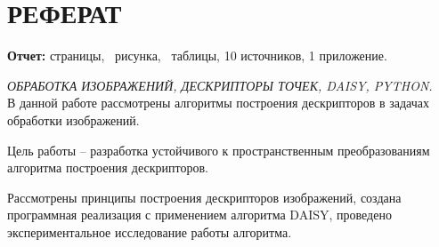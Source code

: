 
\def\l@subsection{\@dottedtocline{2}{3.8em}{3.2em}}
\setcounter{tocdepth}{2}



\newcommand{\incpic}[3]{
	\begin{figure}[H] 
		\begin{center} 
			\texttt{[image: \#1]} 
			\caption{#2}
			\label{#3} 
		\end{center}
	\end{figure} 
}




\setcounter{page}{3}
\setcounter{secnumdepth}{3}

\section*{РЕФЕРАТ}
{
	{\bf Отчет:}
	\pageref{LastPage} страницы,
	\totalfigures\ рисунка,
	\totaltables\ таблицы,
	10 источников,
	1 приложение.
	
	
	\textit{ОБРАБОТКА ИЗОБРАЖЕНИЙ, ДЕСКРИПТОРЫ ТОЧЕК, DAISY, PYTHON.}\\
	
	В данной работе рассмотрены алгоритмы построения дескрипторов в задачах обработки изображений.
	
	Цель работы -- разработка устойчивого к пространственным преобразованиям алгоритма построения дескрипторов.
	
	Рассмотрены принципы построения дескрипторов изображений, создана программная реализация с применением алгоритма DAISY, проведено экспериментальное исследование работы алгоритма.
}
\newpage

\newpage
\tableofcontents


\newpage
{}
{}
